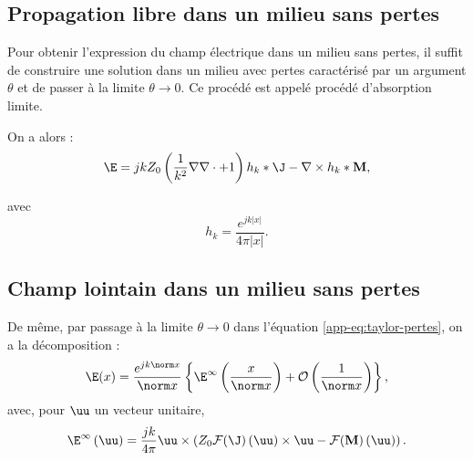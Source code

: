 \subsection{Propagation libre dans un milieu sans pertes}
\label{app-sec:champ-elec}
Pour obtenir l'expression du champ électrique dans un milieu sans pertes, il suffit de construire une solution dans un milieu avec pertes caractérisé par un argument $\theta$ et de passer à la limite $\theta\to 0$. Ce procédé est appelé procédé d'absorption limite.


On a alors :
\begin{equation}
    \E = jkZ_0\left(\frac1{k^2}\nabla\nabla\cdot+1\right)h_k\ast\J - \nabla\times h_k\ast\mathbf M,
\end{equation}

avec $$h_k = \frac{e^{jk|x|}}{4\pi|x|}.$$

\subsection{Champ  lointain dans un milieu sans pertes}
De même, par passage à la limite $\theta\to0$ dans l'équation \eqref{app-eq:taylor-pertes}, on a la décomposition : 
\begin{equation}
    \E(x) = \frac{e^{jk\norm x}}{\norm x}\left\{\E^\infty\left(\frac{x}{\norm x}\right)+\mathcal O\left(\frac1{\norm x}\right)\right\},
    \label{app-eq:taylor}
\end{equation}
%
avec, pour $\uu$ un vecteur unitaire,
\begin{equation}
        \E^\infty\left(\uu\right) = \frac{jk}{4\pi}\uu\times\left(Z_0\mathcal F(\J)\left(\uu\right)\times \uu - \mathcal F(\mathbf M)\left(\uu\right)\right).
\end{equation}

\printbibliography[heading=subbibintoc]